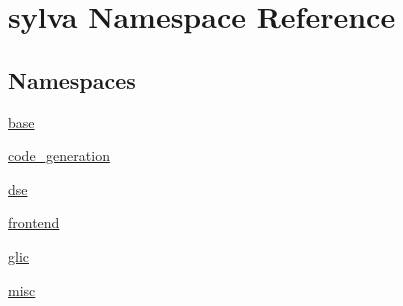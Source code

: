 \hypertarget{namespacesylva}{}\section{sylva Namespace Reference}
\label{namespacesylva}
\subsection*{Namespaces}
\begin{DoxyCompactItemize}
\item 
 \hyperlink{namespacesylva_1_1base}{base}
\item 
 \hyperlink{namespacesylva_1_1code__generation}{code\+\_\+generation}
\item 
 \hyperlink{namespacesylva_1_1dse}{dse}
\item 
 \hyperlink{namespacesylva_1_1frontend}{frontend}
\item 
 \hyperlink{namespacesylva_1_1glic}{glic}
\item 
 \hyperlink{namespacesylva_1_1misc}{misc}
\end{DoxyCompactItemize}
